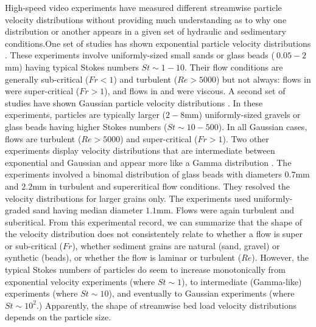 High-speed video experiments have measured different streamwise particle velocity distributions without providing much understanding as to why one distribution or another appears in a given set of hydraulic and sedimentary conditions.One set of studies has shown exponential particle velocity distributions \citep{Charru2004,Lajeunesse2010,Roseberry2012,Seizilles2014,Fathel2015,Fathel2016}.
These experiments involve uniformly-sized small sands or glass beads ($~0.05-2$mm) having typical Stokes numbers $St \sim 1-10$. Their flow conditions are generally sub-critical ($Fr<1$) and turbulent ($Re>5000$) but not always: flows in \citet{Lajeunesse2010} were super-critical ($Fr>1$), and flows in \citet{Charru2004} and \citet{Sezilles2014} were viscous.
A second set of studies have shown Gaussian particle velocity distributions \citep{Ancey2014,Heyman2016,Martin2012}. In these experiments, particles are typically larger ($2-8$mm) uniformly-sized gravels or glass beads having higher Stokes numbers ($St \sim 10-500$). In all Gaussian cases, flows are turbulent ($Re>5000$) and super-critical ($Fr>1$).
Two other experiments display velocity distributions that are intermediate between exponential and Gaussian and appear more like a Gamma distribution \citep{Houssais2012, Liu2019}. The \citet{Houssais2012} experiments involved a binomal distribution of glass beads with diameters $0.7$mm and $2.2$mm in turbulent and supercritical flow conditions. They resolved the velocity distributions for larger grains only. The \citet{Liu2019} experiments used uniformly-graded sand having median diameter $1.1$mm. Flows were again turbulent and subcritical.
From this experimental record, we can summarize that the shape of the velocity distribution does not consistentely relate to whether a flow is super or sub-critical ($Fr$), whether sediment grains are natural (sand, gravel) or synthetic (beads), or whether the flow is laminar or turbulent ($Re$). However, the typical Stokes numbers of particles do seem to increase monotonically from exponential velocity experiments (where $St \sim 1$), to intermediate (Gamma-like) experiments (where $St \sim 10$), and eventually to Gaussian experiments (where $St \sim 10^2$.) Apparently, the shape of streamwise bed load velocity distributions depends on the particle size.

